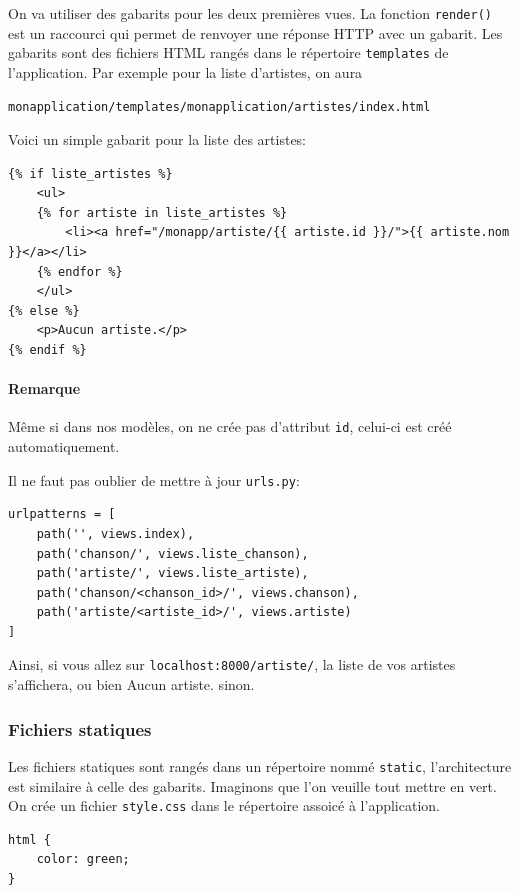 \documentclass[a4paper, 10pt]{article}
\begin{document}
On va utiliser des gabarits pour les deux premières vues. La fonction \texttt{render()} est un raccourci qui permet de renvoyer une réponse HTTP avec un gabarit. Les gabarits sont des fichiers HTML rangés dans le répertoire \texttt{templates} de l'application. Par exemple pour la liste d'artistes, on aura
\begin{verbatim}
monapplication/templates/monapplication/artistes/index.html
\end{verbatim}

Voici un simple gabarit pour la liste des artistes:
\begin{verbatim}
{% if liste_artistes %}
    <ul>
    {% for artiste in liste_artistes %}
        <li><a href="/monapp/artiste/{{ artiste.id }}/">{{ artiste.nom }}</a></li>
    {% endfor %}
    </ul>
{% else %}
    <p>Aucun artiste.</p>
{% endif %}
\end{verbatim}

\paragraph{Remarque} Même si dans nos modèles, on ne crée pas d'attribut \texttt{id}, celui-ci est créé automatiquement.\bigskip

Il ne faut pas oublier de mettre à jour \texttt{urls.py}:
\begin{verbatim}
urlpatterns = [
    path('', views.index),
    path('chanson/', views.liste_chanson),
    path('artiste/', views.liste_artiste),
    path('chanson/<chanson_id>/', views.chanson),
    path('artiste/<artiste_id>/', views.artiste)
]
\end{verbatim}

Ainsi, si vous allez sur \texttt{localhost:8000/artiste/}, la liste de vos artistes s'affichera, ou bien \og Aucun artiste. \fg{} sinon.

\subsubsection{Fichiers statiques}

Les fichiers statiques sont rangés dans un répertoire nommé \texttt{static}, l'architecture est similaire à celle des gabarits. Imaginons que l'on veuille tout mettre en vert. On crée un fichier \texttt{style.css} dans le répertoire assoicé à l'application.

\begin{verbatim}
html {
    color: green;
}
\end{verbatim}
\end{document}
